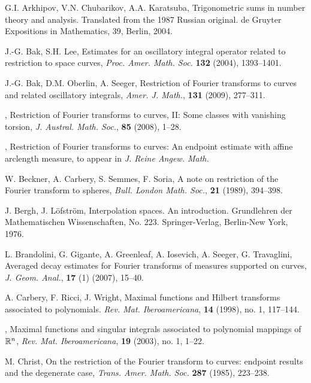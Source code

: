 \documentclass[11 pt]{amsart}
\theoremstyle{plain}
\numberwithin{equation}{section}
\theoremstyle{plain}
\numberwithin{equation}{section}
\theoremstyle{remark}
\begin{document}
\begin{thebibliography}{99999}                                                                                                 G.I. Arkhipov,  V.N. Chubarikov, A.A.  Karatsuba,
 Trigonometric sums in number theory and analysis. Translated
from the 1987 Russian original. de Gruyter Expositions in
Mathematics, 39, Berlin, 2004.

 J.-G. Bak, S.H. Lee, Estimates for an oscillatory
integral operator related to restriction to space curves,
\textit{Proc. Amer. Math. Soc. } {{\bf {132}}} (2004), 1393--1401.

 J.-G. Bak, D.M. Oberlin,  A. Seeger,
Restriction of Fourier transforms to curves and related
oscillatory integrals, \textit{Amer. J. Math.}, {{\bf {131}}} (2009),
277--311.

 \bysame,
Restriction of Fourier transforms to curves, II: Some classes with
vanishing torsion, \textit{J. Austral. Math. Soc.}, {{\bf {85}}} (2008),
1--28.

 \bysame,
Restriction of Fourier transforms to curves: An endpoint
estimate with affine arclength measure, to appear in \textit{J. Reine Angew. Math.}

 W. Beckner, A. Carbery, S. Semmes,  F. Soria,
A note on restriction of the Fourier transform to spheres, \textit{Bull. London Math. Soc.},
{{\bf {21}}} (1989),  394--398.

 J. Bergh, J. L\"ofstr\"om, Interpolation spaces. An introduction.
Grundlehren der Mathematischen Wissenschaften, No. 223.
Springer-Verlag, Berlin-New York, 1976.

 L. Brandolini, G. Gigante, A. Greenleaf, A. Iosevich, A. Seeger, G. Travaglini,
Averaged decay estimates for Fourier transforms of measures supported on curves,
\textit{J. Geom. Anal.}, {{\bf {17}}} (1) (2007), 15--40.

 A. Carbery, F. Ricci, J. Wright, Maximal functions and Hilbert transforms associated to polynomials.
\textit{Rev. Mat. Iberoamericana}, {{\bf {14}}} (1998), no. 1, 117--144.

 \bysame, Maximal functions and singular integrals associated to polynomial mappings of $\Bbb R^n$, \textit{Rev. Mat. Iberoamericana}, {{\bf {19}}} (2003), no. 1, 1--22.

 M. Christ, On the restriction of the Fourier transform to
curves: endpoint results and the degenerate case, \textit{Trans.
Amer. Math. Soc.} {{\bf {287}}} (1985), 223--238.


\end{thebibliography}
\end{document}
